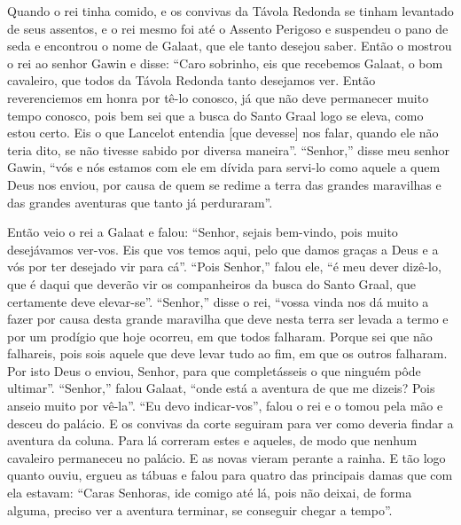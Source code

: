 Quando o rei tinha comido, e os convivas da Távola Redonda se tinham levantado
de seus assentos, e o rei mesmo foi até o Assento Perigoso e suspendeu o pano
de seda e encontrou o nome de Galaat, que ele tanto desejou saber. Então o
mostrou o rei ao senhor Gawin e disse: “Caro sobrinho, eis que recebemos
Galaat, o bom cavaleiro, que todos da Távola Redonda tanto desejamos ver.
Então reverenciemos em honra por tê-lo conosco, já que não deve permanecer
muito tempo conosco, pois bem sei que a busca do Santo Graal logo se eleva,
como estou certo. Eis o que Lancelot entendia [que devesse] nos falar, quando ele não teria
dito, se não tivesse sabido por diversa maneira”. “Senhor,” disse meu senhor
Gawin, “vós e nós estamos com ele em dívida para servi-lo como aquele a quem
Deus nos enviou, por causa de quem se redime a terra das grandes maravilhas e
das grandes aventuras que tanto já perduraram”. 

Então veio o rei a Galaat e falou: “Senhor, sejais bem-vindo, pois muito
desejávamos ver-vos. Eis que vos temos aqui, pelo que damos graças a Deus e a
vós por ter desejado vir para cá”. “Pois Senhor,” falou ele, “é meu dever
dizê-lo, que é daqui que deverão vir os companheiros da busca do Santo Graal,
que certamente deve elevar-se”. “Senhor,” disse o rei, “vossa vinda nos dá
muito a fazer por causa desta grande maravilha que deve nesta terra ser levada
a termo e por um prodígio que hoje ocorreu, em que todos falharam. Porque sei
que não falhareis, pois sois aquele que deve levar tudo ao fim, em que os
outros falharam. Por isto Deus o enviou, Senhor, para que completásseis o que
ninguém pôde ultimar”. “Senhor,” falou Galaat, “onde está a aventura de que me
dizeis? Pois anseio muito por vê-la”. “Eu devo indicar-vos”, falou o rei e o
tomou pela mão e desceu do palácio. E os convivas da corte seguiram para ver
como deveria findar a aventura da coluna. Para lá correram estes e aqueles, de
modo que nenhum cavaleiro permaneceu no palácio. E as novas vieram perante a
rainha. E tão logo quanto ouviu, ergueu as tábuas e falou para quatro das
principais damas que com ela estavam: “Caras Senhoras, ide comigo até lá, pois
não deixai, de forma alguma, preciso ver a aventura terminar, se conseguir
chegar a tempo”. 


